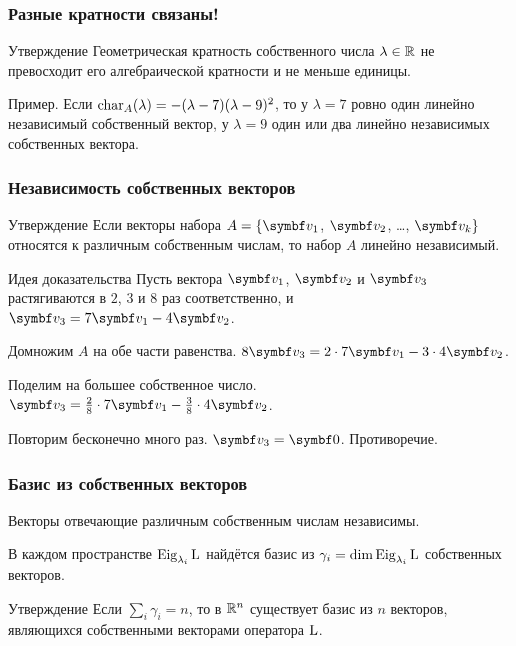 \begin{frame}
\frametitle{Разные кратности связаны!}

\begin{block}{Утверждение}
    Геометрическая кратность собственного числа $\lambda\in \mathbb{R}$ не превосходит его алгебраической кратности и не меньше единицы.     
\end{block}

\pause
Пример. Если $\operatorname{char}_A(\lambda) = -(\lambda- 7)(\lambda - 9)^2$, то
у $\lambda =7$ ровно один линейно независимый собственный вектор, 
у $\lambda =9$ один или два линейно независимых собственных вектора. 

\end{frame}


\begin{frame}
    \frametitle{Независимость собственных векторов}

    \begin{block}{Утверждение}
        Если векторы набора $A = \{\bv_1$, $\bv_2$, \ldots, $\bv_k\}$ относятся к различным
        собственным числам, то набор $A$ линейно независимый.
    \end{block}
    \pause
    \begin{block}{Идея доказательства}
        Пусть вектора $\bv_1$, $\bv_2$ и $\bv_3$ растягиваются в $2$, $3$ и $8$ раз соответственно, 
        и $\bv_3 = 7\bv_1 - 4 \bv_2$.\pause

        Домножим $A$ на обе части равенства. $8\bv_3 = 2 \cdot 7\bv_1 - 3\cdot 4\bv_2$.\pause

        Поделим на большее собственное число. $\bv_3 = \frac{2}{8} \cdot 7\bv_1 - \frac{3}{8}\cdot 4\bv_2$. \pause
        
        Повторим бесконечно много раз. $\bv_3 = \bzero$.
        Противоречие.
        
    \end{block}

    

\end{frame}




\begin{frame}
    \frametitle{Базис из собственных векторов}
    Векторы отвечающие различным собственным числам независимы.
    \pause 

    В каждом пространстве $\operatorname{Eig}_{\lambda_i}\operatorname{L}$ найдётся базис из
     $\gamma_i = \dim \operatorname{Eig}_{\lambda_i}\operatorname{L}$ собственных векторов.
     \pause

    \begin{block}{Утверждение}
Если $\sum_i \gamma_i = n$, то в $\mathbb{R}^n$ существует базис 
из $n$ векторов, являющихся собственными векторами оператора $\operatorname{L}$.            
    \end{block}

\end{frame}


